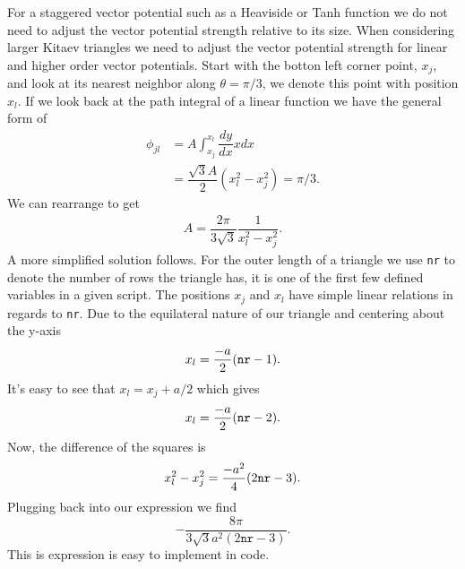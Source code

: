 For a staggered vector potential such as a Heaviside or Tanh function we do not need to adjust the vector potential strength relative to its size.
When considering larger Kitaev triangles we need to adjust the vector potential strength for linear and higher order vector potentials.
Start with the botton left corner point, $x_j$, and look at its nearest neighbor along $\theta=\pi/3$, we denote this point with position $x_l$.
If we look back at the path integral of a linear function we have the general form of
\begin{align}
  \phi_{jl} &= A \int_{x_j}^{x_l} \dfrac{dy}{dx} x dx \nonumber \\
  &= \dfrac{\sqrt{3} A}{2} (x_l^2 - x_j^2) = \pi/3. \nonumber
\end{align}
We can rearrange to get
\begin{align}
  A = \dfrac{2 \pi}{3 \sqrt{3}} \dfrac{1}{x_l^2 - x_j^2}.
\end{align}
A more simplified solution follows.
For the outer length of a triangle we use \verb|nr| to denote the number of rows the triangle has, it is one of the first few defined variables in a given script.
The positions $x_j$ and $x_l$ have simple linear relations in regards to \verb|nr|.
Due to the equilateral nature of our triangle and centering about the y-axis
\begin{equation}
  x_l = \dfrac{-a}{2} (\verb|nr| - 1).
\end{equation}
It's easy to see that $x_l = x_j + a/2$ which gives
\begin{equation}
  x_l = \dfrac{-a}{2} (\verb|nr| - 2).
\end{equation}
Now, the difference of the squares is
\begin{equation}
  x_l^2 - x_j^2 = \dfrac{-a^2}{4} (2 \verb|nr| - 3).
\end{equation}
Plugging back into our expression we find
\begin{equation}
  -\dfrac{8 \pi}{3 \sqrt{3} a^2 (2 \texttt{nr}- 3)}.
\end{equation}
This is expression is easy to implement in code.
